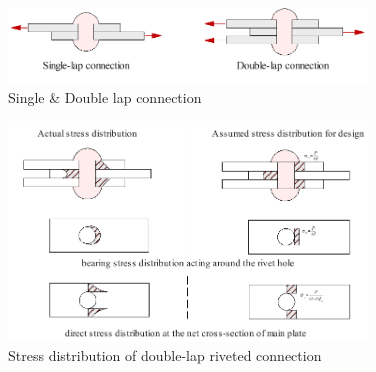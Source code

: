 \begin{figure}
    \centering
    \includegraphics[width=0.85\textwidth]{imgs/ch2/lap-connec.pdf}
    \caption{Single \& Double lap connection}
    \label{fig-lapconnec}
\end{figure}


\begin{figure}
    \centering
    \includegraphics[width=0.85\textwidth]{imgs/ch2/bstressdistr-0.pdf}
    \caption{Stress distribution of double-lap riveted connection}
    \label{fig-rsdisri}
\end{figure}


